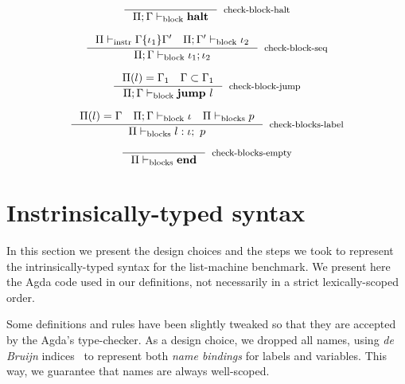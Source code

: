 \documentclass[sigconf]{acmart}
\theoremstyle{definition}
\begin{document}

\begin{equation}
\inference{}
          {\Pi;\Gamma\vdash_{\text{block}} \textbf{halt}}[check-block-halt]
\end{equation}

\begin{equation}
\inference{\Pi\vdash_{\text{instr}} \Gamma\{\iota_1\}\Gamma'~~~\Pi;\Gamma'\vdash_{\text{block}} \iota_2}
          {\Pi;\Gamma\vdash_{\text{block}} \iota_1;\iota_2}[check-block-seq]
\end{equation}

\begin{equation}
\inference{\Pi(l)=\Gamma_1~~~\Gamma \subset \Gamma_1}
          {\Pi;\Gamma\vdash_{\text{block}} \textbf{jump}~l}[check-block-jump]
\end{equation}


\begin{equation}
\inference{\Pi(l)=\Gamma~~~\Pi;\Gamma\vdash_{\text{block}} \iota~~~\Pi\vdash_{\text{blocks}} p}
          {\Pi\vdash_{\text{blocks}} l: \iota;~p}[check-blocks-label]
\end{equation}

\begin{equation}
\inference{}
          {\Pi\vdash_{\text{blocks}} \textbf{end}}[check-blocks-empty]
\end{equation}

\section{Instrinsically-typed syntax}\label{sec:typing}


In this section we present the design choices and the steps we took to represent the intrinsically-typed syntax for the list-machine benchmark. We present here the Agda code used in our definitions, not necessarily in a strict lexically-scoped order.

Some definitions and rules have been slightly tweaked so that they are accepted by the Agda's type-checker. As a design choice, we dropped all names, using \emph{de Bruijn} indices~\cite{DEBRUIJN72} to represent both \emph{name bindings} for labels and variables. This way, we guarantee that names are always well-scoped.
\end{document}
